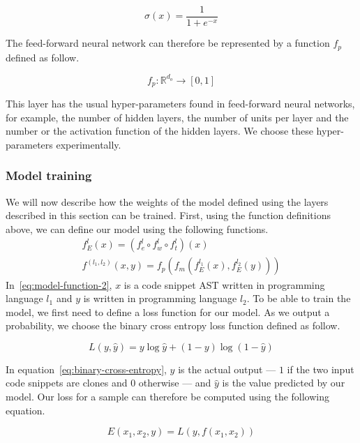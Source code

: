 \begin{equation}
  \label{eq:sigmoid}
  \sigma(x) = \frac{1}{1 + e^{-x}}
\end{equation}

The feed-forward neural network can therefore be represented by a function $f_p$
defined as follow.

\begin{equation}
  \label{eq:feed-forward}
  f_p : \mathbb{R}^{d_o} \rightarrow [0, 1]
\end{equation}

This layer has the usual hyper-parameters found in feed-forward neural networks,
for example, the number of hidden layers, the number of units per layer and the
number or the activation function of the hidden layers. We choose these
hyper-parameters experimentally.
\subsubsection{Model training}
We will now describe how the weights of the model defined using the layers
described in this section can be trained. First, using the function definitions
above, we can define our model using the following functions.
\begin{align}
  \label{eq:model-function-1}
  f_E^l(x) = (f_e^l \circ f_w^l \circ f_t^l)(x)\\
  \label{eq:model-function-2}
  f^{(l_1, l_2)}(x, y) = f_p\left( f_m\left( f_E^{l_1}(x), f_E^{l_2}(y) \right) \right)
\end{align}
In~\ref{eq:model-function-2}, $x$ is a code snippet AST written in programming
language $l_1$ and $y$ is written in programming language $l_2$. To be able to
train the model, we first need to define a loss function for our model. As we
output a probability, we choose the binary cross entropy loss function defined
as follow.

\begin{equation}
  \label{eq:binary-cross-entropy}
  L(y, \hat{y}) = y\log \hat{y} + (1 - y) \log(1 - \hat{y})
\end{equation}

In equation~\ref{eq:binary-cross-entropy}, $y$ is the actual output --- $1$ if
the two input code snippets are clones and $0$ otherwise --- and $\hat{y}$ is
the value predicted by our model. Our loss for a sample can therefore be
computed using the following equation.

\begin{equation}
  E(x_1, x_2, y) = L(y, f(x_1, x_2))
\end{equation}


